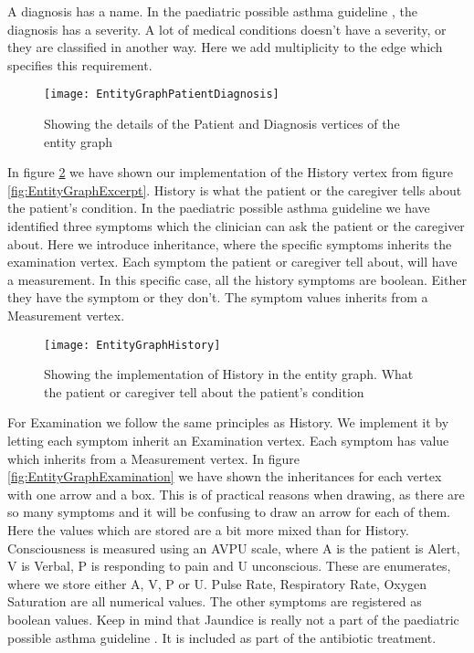 A diagnosis has a name. In the paediatric possible asthma guideline \parencite{RepublicofKeny2016}, the diagnosis has a severity. A lot of medical conditions doesn't have a severity, or they are classified in another way. Here we add multiplicity to the edge which specifies this requirement. 

\begin{figure}[h!]
	\texttt{[image: EntityGraphPatientDiagnosis]}
	\caption {Showing the details of the Patient and Diagnosis vertices of the entity graph}
	\label{fig:EntityGraphPatientDiagnosis}
\end{figure}

In figure \ref{fig:EntityGraphHistory} we have shown our implementation of the History vertex from figure \ref{fig:EntityGraphExcerpt}. History is what the patient or the caregiver tells about the patient's condition. In the paediatric possible asthma guideline \parencite{RepublicofKeny2016} we have identified three symptoms which the clinician can ask the patient or the caregiver about. Here we introduce inheritance, where the specific symptoms inherits the examination vertex. Each symptom the patient or caregiver tell about, will have a measurement. In this specific case, all the history symptoms are boolean. Either they have the symptom or they don't. The symptom values inherits from a Measurement vertex.

\begin{figure}[h!]
	\texttt{[image: EntityGraphHistory]}
	\caption {Showing the implementation of History in the entity graph. What the patient or caregiver tell about the patient's condition}
		\label{fig:EntityGraphHistory}
\end{figure}

For Examination we follow the same principles as History. We implement it by letting each symptom inherit an Examination vertex. Each symptom has value which inherits from a Measurement vertex. In figure \ref{fig:EntityGraphExamination} we have shown the inheritances for each vertex with one arrow and a box. This is of practical reasons when drawing, as there are so many symptoms and it will be confusing to draw an arrow for each of them. Here the values which are stored are a bit more mixed than for History. Consciousness is measured using an AVPU scale, where A is the patient is Alert, V is Verbal, P is responding to pain and U unconscious. These are enumerates, where we store either A, V, P or U. Pulse Rate, Respiratory Rate, Oxygen Saturation are all numerical values. The other symptoms are registered as boolean values. Keep in mind that Jaundice is really not a part of the paediatric possible asthma guideline \parencite{RepublicofKeny2016}. It is included as part of the antibiotic treatment.


